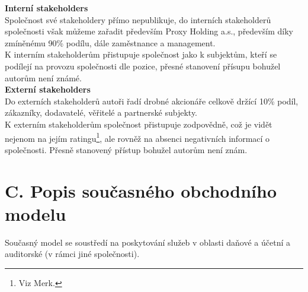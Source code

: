 \textbf{Interní stakeholders}\\


Společnost své stakeholdery přímo nepublikuje, do interních stakeholderů společnosti však můžeme zařadit především Proxy Holding a.s., především díky zmíněnému 90\% podílu, dále zaměstnance a management.\\

K interním stakeholderům přistupuje společnost jako k subjektům, kteří se podílejí na provozu společnosti dle pozice, přesné stanovení přísupu bohužel autorům není známé.\\

\textbf{Externí stakeholders}\\


Do externích stakeholderů autoři řadí drobné akcionáře celkově držící 10\% podíl, zákazníky, dodavatelé, věřitelé a partnerské subjekty.\\

K externím stakeholderům společnost přistupuje zodpovědně, což je vidět nejenom na jejím ratingu\footnote{Viz Merk.}, ale rovněž na absenci negativních informací o společnosti. Přesně stanovený přístup bohužel autorům není znám.\\



\section*{C. Popis současného obchodního modelu}
\label{sec:Popis soucasneho obchodniho modelu}

Současný model se soustředí na poskytování služeb v oblasti daňové a účetní a auditorské (v rámci jiné společnosti).\\

